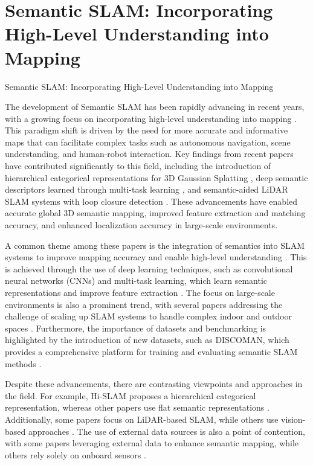 \documentclass[conference]{IEEEtran}
\begin{document}
\section{Semantic SLAM: Incorporating High-Level Understanding into Mapping}
Semantic SLAM: Incorporating High-Level Understanding into Mapping

The development of Semantic SLAM has been rapidly advancing in recent years, with a growing focus on incorporating high-level understanding into mapping \cite{b1}. This paradigm shift is driven by the need for more accurate and informative maps that can facilitate complex tasks such as autonomous navigation, scene understanding, and human-robot interaction. Key findings from recent papers have contributed significantly to this field, including the introduction of hierarchical categorical representations for 3D Gaussian Splatting \cite{b2}, deep semantic descriptors learned through multi-task learning \cite{b3}, and semantic-aided LiDAR SLAM systems with loop closure detection \cite{b4}. These advancements have enabled accurate global 3D semantic mapping, improved feature extraction and matching accuracy, and enhanced localization accuracy in large-scale environments.

A common theme among these papers is the integration of semantics into SLAM systems to improve mapping accuracy and enable high-level understanding \cite{b5}. This is achieved through the use of deep learning techniques, such as convolutional neural networks (CNNs) and multi-task learning, which learn semantic representations and improve feature extraction \cite{b6}. The focus on large-scale environments is also a prominent trend, with several papers addressing the challenge of scaling up SLAM systems to handle complex indoor and outdoor spaces \cite{b7}. Furthermore, the importance of datasets and benchmarking is highlighted by the introduction of new datasets, such as DISCOMAN, which provides a comprehensive platform for training and evaluating semantic SLAM methods \cite{b8}.

Despite these advancements, there are contrasting viewpoints and approaches in the field. For example, Hi-SLAM proposes a hierarchical categorical representation, whereas other papers use flat semantic representations \cite{b9}. Additionally, some papers focus on LiDAR-based SLAM, while others use vision-based approaches \cite{b10}. The use of external data sources is also a point of contention, with some papers leveraging external data to enhance semantic mapping, while others rely solely on onboard sensors \cite{b11}.
\end{document}
